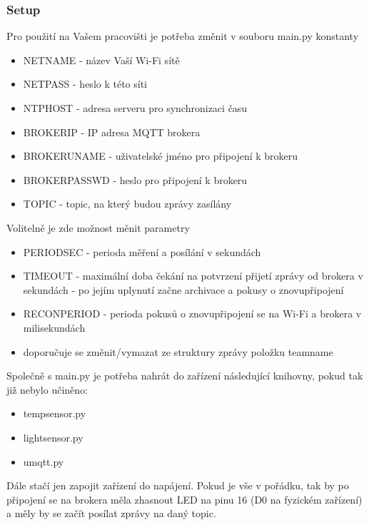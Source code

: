 \subsubsection{Setup}
Pro použití na Vašem pracovišti je potřeba změnit v souboru main.py konstanty
\begin{itemize}
    \item NET\textunderscore NAME - název Vaší Wi-Fi sítě
    \item NET\textunderscore PASS - heslo k této síti
    \item NTP\textunderscore HOST - adresa serveru pro synchronizaci času
    \item BROKER\textunderscore IP - IP adresa MQTT brokera
    \item BROKER\textunderscore UNAME - uživatelské jméno pro připojení k brokeru
    \item BROKER\textunderscore PASSWD - heslo pro připojení k brokeru
    \item TOPIC - topic, na který budou zprávy zasílány
\end{itemize}
Volitelně je zde možnost měnit parametry
\begin{itemize}
    \item PERIOD\textunderscore SEC - perioda měření a posílání v sekundách
    \item TIMEOUT - maximální doba čekání na potvrzení přijetí zprávy od brokera v sekundách - po jejím uplynutí začne archivace a pokusy o znovupřipojení
    \item RECON\textunderscore PERIOD - perioda pokusů o znovupřipojení se na Wi-Fi a brokera v milisekundách
    \item doporučuje se změnit/vymazat ze struktury zprávy položku team\textunderscore name
\end{itemize}
Společně s main.py je potřeba nahrát do zařízení následující knihovny, pokud tak již nebylo učiněno:
\begin{itemize}
    \item temp\textunderscore sensor.py
    \item light\textunderscore sensor.py
    \item umqtt.py
\end{itemize}
Dále stačí jen zapojit zařízení do napájení. Pokud je vše v pořádku, tak by po připojení se na brokera měla zhasnout LED na pinu 16 (D0 na fyzickém zařízení) a měly by se začít posílat zprávy na daný topic.


